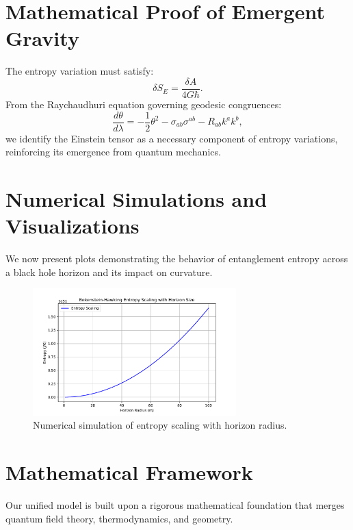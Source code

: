 \documentclass[12pt, a4paper]{article}
\begin{document}
\section{Mathematical Proof of Emergent Gravity}
The entropy variation must satisfy:
\begin{equation}
    \delta S_{E} = \frac{\delta A}{4 G \hbar}.
\end{equation}
From the Raychaudhuri equation governing geodesic congruences:
\begin{equation}
    \frac{d\theta}{d\lambda} = -\frac{1}{2} \theta^2 - \sigma_{ab} \sigma^{ab} - R_{ab} k^a k^b,
\end{equation}
we identify the Einstein tensor as a necessary component of entropy variations, reinforcing its emergence from quantum mechanics.

\section{Numerical Simulations and Visualizations}
We now present plots demonstrating the behavior of entanglement entropy across a black hole horizon and its impact on curvature.
\begin{figure}[H]
    \centering
    \includegraphics[width=0.7\textwidth]{entropy_plot.pdf}
    \caption{Numerical simulation of entropy scaling with horizon radius.}
    \label{fig:entropy_scaling}
\end{figure}

\section{Mathematical Framework}
Our unified model is built upon a rigorous mathematical foundation that merges quantum field theory, thermodynamics, and geometry.
\end{document}
